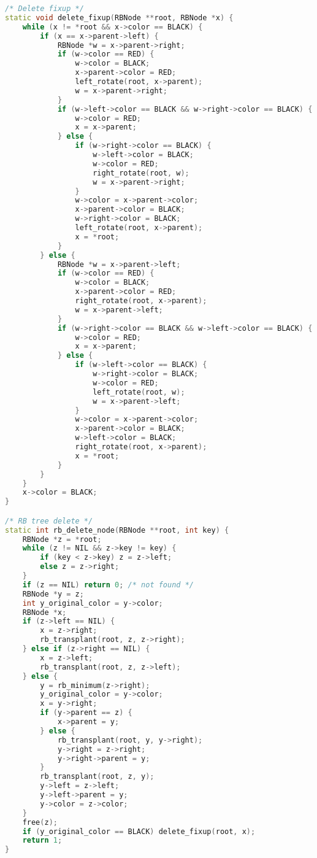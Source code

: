 \documentclass[12pt,a4paper]{article}
\begin{document}
\begin{lstlisting}[language=C++,caption=RBTree\_Hash.cpp]
/* Delete fixup */
static void delete_fixup(RBNode **root, RBNode *x) {
    while (x != *root && x->color == BLACK) {
        if (x == x->parent->left) {
            RBNode *w = x->parent->right;
            if (w->color == RED) {
                w->color = BLACK;
                x->parent->color = RED;
                left_rotate(root, x->parent);
                w = x->parent->right;
            }
            if (w->left->color == BLACK && w->right->color == BLACK) {
                w->color = RED;
                x = x->parent;
            } else {
                if (w->right->color == BLACK) {
                    w->left->color = BLACK;
                    w->color = RED;
                    right_rotate(root, w);
                    w = x->parent->right;
                }
                w->color = x->parent->color;
                x->parent->color = BLACK;
                w->right->color = BLACK;
                left_rotate(root, x->parent);
                x = *root;
            }
        } else {
            RBNode *w = x->parent->left;
            if (w->color == RED) {
                w->color = BLACK;
                x->parent->color = RED;
                right_rotate(root, x->parent);
                w = x->parent->left;
            }
            if (w->right->color == BLACK && w->left->color == BLACK) {
                w->color = RED;
                x = x->parent;
            } else {
                if (w->left->color == BLACK) {
                    w->right->color = BLACK;
                    w->color = RED;
                    left_rotate(root, w);
                    w = x->parent->left;
                }
                w->color = x->parent->color;
                x->parent->color = BLACK;
                w->left->color = BLACK;
                right_rotate(root, x->parent);
                x = *root;
            }
        }
    }
    x->color = BLACK;
}

/* RB tree delete */
static int rb_delete_node(RBNode **root, int key) {
    RBNode *z = *root;
    while (z != NIL && z->key != key) {
        if (key < z->key) z = z->left;
        else z = z->right;
    }
    if (z == NIL) return 0; /* not found */
    RBNode *y = z;
    int y_original_color = y->color;
    RBNode *x;
    if (z->left == NIL) {
        x = z->right;
        rb_transplant(root, z, z->right);
    } else if (z->right == NIL) {
        x = z->left;
        rb_transplant(root, z, z->left);
    } else {
        y = rb_minimum(z->right);
        y_original_color = y->color;
        x = y->right;
        if (y->parent == z) {
            x->parent = y;
        } else {
            rb_transplant(root, y, y->right);
            y->right = z->right;
            y->right->parent = y;
        }
        rb_transplant(root, z, y);
        y->left = z->left;
        y->left->parent = y;
        y->color = z->color;
    }
    free(z);
    if (y_original_color == BLACK) delete_fixup(root, x);
    return 1;
}


\end{lstlisting}
\end{document}
